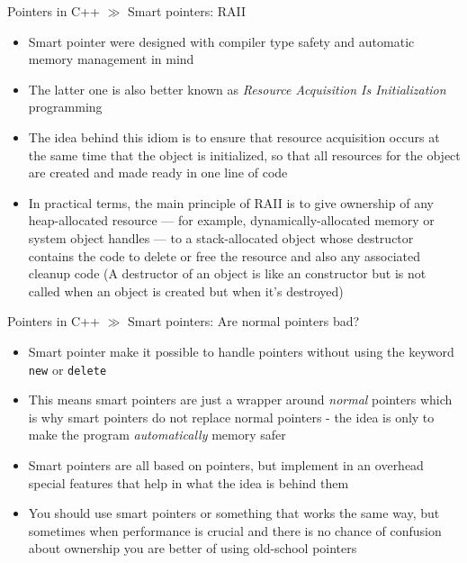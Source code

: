 \documentclass[10pt]{beamer}
\begin{document}
\begin{frame}{Pointers in C++ $\gg$ Smart pointers: RAII}
\begin{itemize}
	\item Smart pointer were designed with compiler type safety and automatic memory management in mind
	\item The latter one is also better known as \textit{Resource Acquisition Is Initialization} programming
	\item The idea behind this idiom is to ensure that resource acquisition occurs at the same time that the object is initialized, so that all resources for the object are created and made ready in one line of code
	\item In practical terms, the main principle of RAII is to give ownership of any heap-allocated resource — for example, dynamically-allocated memory or system object handles — to a stack-allocated object whose destructor contains the code to delete or free the resource and also any associated cleanup code (A destructor of an object is like an constructor but is not called when an object is created but when it's destroyed)
\end{itemize}
\end{frame}

\begin{frame}{Pointers in C++ $\gg$ Smart pointers: Are normal pointers bad?}
\begin{itemize}
	\item Smart pointer make it possible to handle pointers without using the keyword \texttt{new} or \texttt{delete}
	\item This means smart pointers are just a wrapper around \textit{normal} pointers which is why smart pointers do not replace normal pointers - the idea is only to make the program \textit{automatically} memory safer
	\item Smart pointers are all based on pointers, but implement in an overhead special features that help in what the idea is behind them
	\item You should use smart pointers or something that works the same way, but sometimes when performance is crucial and there is no chance of confusion about ownership you are better of using old-school pointers
\end{itemize}
\end{frame}
\end{document}
